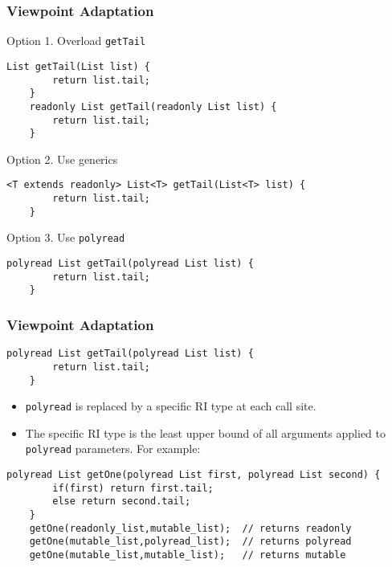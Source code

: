 \documentclass{beamer}
\newcommand{\code}[1]{\lstinline$#1$}
\begin{document}
\begin{frame}[containsverbatim]   %
\frametitle{Viewpoint Adaptation}
\greencolor Option 1. Overload \code{getTail} \blackcolor
\begin{lstlisting}[escapechar=`]
	List getTail(List list) {
		return list.tail;
	}
	readonly List getTail(readonly List list) {
		return list.tail;
	}
\end{lstlisting}
\greencolor Option 2. Use generics \blackcolor
\begin{lstlisting}[escapechar=`]
	<T extends readonly> List<T> getTail(List<T> list) {
		return list.tail;
	}
\end{lstlisting}
\greencolor Option 3. Use \code{polyread} \blackcolor
\begin{lstlisting}[escapechar=`]
	polyread List getTail(polyread List list) {
		return list.tail;
	}
\end{lstlisting}
\end{frame}

\begin{frame}[containsverbatim]   %
\frametitle{Viewpoint Adaptation}
\begin{lstlisting}[escapechar=`]
	polyread List getTail(polyread List list) {
		return list.tail;
	}
\end{lstlisting}
\begin{itemize}
\item \code{polyread} is replaced by a specific RI type at each call site.
\item The specific RI type is the least upper bound of all arguments applied
	to \code{polyread} parameters. For example:
\end{itemize}
\begin{lstlisting}[basicstyle=\scriptsize\ttfamily,escapechar=`]
	polyread List getOne(polyread List first, polyread List second) {
		if(first) return first.tail;
		else return second.tail;
	}
	getOne(readonly_list,mutable_list);  // returns readonly
	getOne(mutable_list,polyread_list);  // returns polyread
	getOne(mutable_list,mutable_list);   // returns mutable
\end{lstlisting}
\end{frame}
\end{document}
